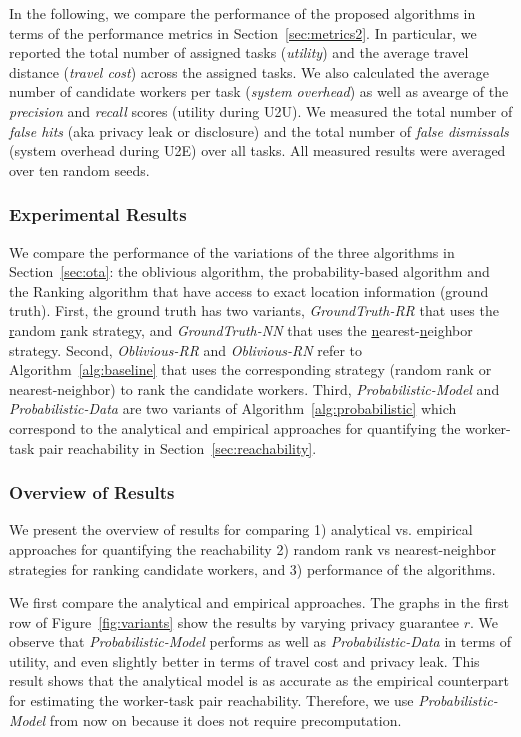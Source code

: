 \documentclass{USC-Thesis}
\numberwithin{equation}{chapter}
\begin{document}
In the following, we compare the performance of the proposed algorithms in terms of the performance metrics in Section~\ref{sec:metrics2}. In particular, we reported the total number of assigned tasks (\emph{utility}) and the average travel distance (\emph{travel cost}) across the assigned tasks. We also calculated the average number of candidate workers per task (\emph{system overhead}) as well as avearge of the \emph{precision} and \emph{recall} scores (utility during U2U). We measured the total number of \emph{false hits} (aka privacy leak or disclosure) and the total number of \emph{false dismissals} (system overhead during U2E) over all tasks.
All measured results were averaged over ten random seeds.

\subsubsection{Experimental Results}
\label{sec:results}

We compare the performance of the variations of the three algorithms in Section~\ref{sec:ota}: the oblivious algorithm, the probability-based algorithm and the Ranking algorithm that have access to exact location information (ground truth).
First, the ground truth has two variants, \emph{GroundTruth-RR} that uses the \underline{r}andom \underline{r}ank strategy, and \emph{GroundTruth-NN} that uses the \underline{n}earest-\underline{n}eighbor strategy.
Second, \emph{Oblivious-RR} and \emph{Oblivious-RN} refer to Algorithm~\ref{alg:baseline} that uses the corresponding strategy (random rank or nearest-neighbor) to rank the candidate workers. Third, \emph{Probabilistic-Model} and \emph{Probabilistic-Data} are two variants of Algorithm~\ref{alg:probabilistic} which correspond to the analytical and empirical approaches for quantifying the worker-task pair reachability in Section~\ref{sec:reachability}.

\subsubsection{Overview of Results}
We present the overview of results for comparing 1) analytical vs. empirical approaches for quantifying the reachability 2) random rank vs nearest-neighbor strategies for ranking candidate workers, and 3) performance of the algorithms.

We first compare the analytical and empirical approaches.
The graphs in the first row of Figure~\ref{fig:variants} show the results by varying privacy guarantee $r$. We observe that \emph{Probabilistic-Model} performs as well as \emph{Probabilistic-Data} in terms of utility, and even slightly better in terms of travel cost and privacy leak. This result shows that the analytical model is as accurate as the empirical counterpart for estimating the worker-task pair reachability. Therefore, we use \emph{Probabilistic-Model} from now on because it does not require precomputation.
\end{document}
